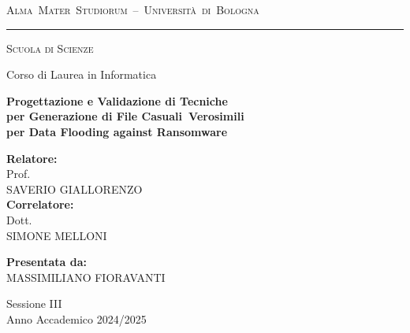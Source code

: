 \thispagestyle{empty}

\begin{center}

\vspace*{1cm}

{\Large \textsc{\mbox{Alma Mater Studiorum -- Università di Bologna}}}


\vspace{0.3cm}

\rule{\textwidth}{0.4pt}

\vspace{0.5cm}

{\large \textsc{Scuola di Scienze}}

\vspace{0.2cm}

{\large Corso di Laurea in Informatica}

\vspace{2.5cm}

\begin{center}
{\large\bfseries
Progettazione e Validazione di Tecniche\\[0.1cm]
per Generazione di File Casuali~Verosimili\\[0.1cm]
per Data Flooding against Ransomware
}
\end{center}






\vspace{3cm}

\begin{minipage}[t]{0.45\textwidth}
\raggedright
\textbf{Relatore:}\\
Prof.\\
SAVERIO GIALLORENZO\\[0.4cm]
\textbf{Correlatore:}\\
Dott.\\
SIMONE MELLONI
\end{minipage}
\hfill
\begin{minipage}[t]{0.45\textwidth}
\raggedleft
\textbf{Presentata da:}\\
MASSIMILIANO FIORAVANTI
\end{minipage}

\vspace{2.0cm}

{\large Sessione III}\\[0.2cm]
{\large Anno Accademico 2024/2025}

\end{center}

\clearpage
